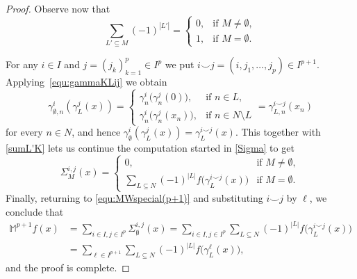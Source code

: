 \documentclass[10pt,a4paper]{amsart}
\begin{document}
\begin{proof}
Observe now that
\begin{equation}\label{sumL'K}
\sum_{L'\subseteq M}(-1)^{|L'|}=
\begin{cases}
0,&\text{if }M\neq\emptyset,\\
1,&\text{if }M=\emptyset. 
\end{cases}
\end{equation}

For any $i\in I$ and $j=(j_k)_{k=1}^p\in I^p$ we put $i\smallsmile j=(i,j_1,\dots,j_p)\in I^{p+1}$.
Applying~\eqref{equ:gammaKLij} we obtain 
\begin{equation*}
\gamma^i_{\emptyset,n}(\gamma^j_L(x))
=\begin{cases}
\gamma^i_n\big(\gamma^j_n(0)\big),&\text{if }n\in L,\\
\gamma^i_n\big(\gamma^j_n(x_n)\big),&\text{if }n\in N\setminus L
\end{cases}
=\gamma^{i\smallsmile j}_{L,n}(x_n)
\end{equation*}
for every $n\in N$, and hence $\gamma^i_{\emptyset}(\gamma^j_L(x))=\gamma^{i\smallsmile j}_{L}(x)$.
This together with \eqref{sumL'K} lets us continue the computation started in \eqref{Sigma} to get
\begin{equation*}
\Sigma^{i,j}_M(x)=
\begin{cases}
0,&\text{if }M\ne\emptyset,\\ 			
\sum_{L\subseteq N}(-1)^{|L|}f\big(\gamma^{i\smallsmile j}_L(x)\big)&\text{if }M=\emptyset.
\end{cases}
\end{equation*}
Finally, returning to \eqref{equ:MWspecial(p+1)} and substituting $i\smallsmile j$ by $\ell$, we conclude that
\begin{align*}
\mathbb{M}^{p+1} f(x)&=\sum_{i\in I,j\in  I^{p}}\Sigma_\emptyset^{i,j}(x)
=\sum_{i\in I, j\in  I^{p}}\sum_{L\subseteq N}(-1)^{|L|}f\big(\gamma^{i\smallsmile j}_L(x)\big)\\
&=\sum_{\ell\in I^{p+1}}\sum_{L\subseteq N}(-1)^{|L|}f\big(\gamma^{\ell}_L(x)\big),
\end{align*}
and the proof is complete.
\end{proof}
\end{document}
